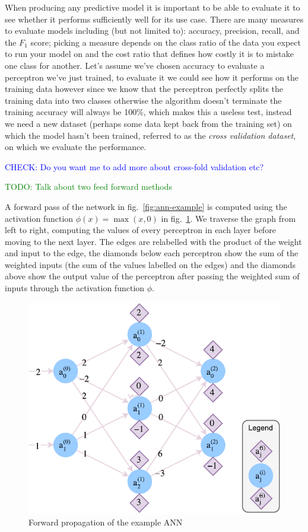 \documentclass[A4paper,draft]{scrreprt}
\begin{document}
When producing any predictive model it is important to be able to
evaluate it to see whether it performs sufficiently well for its use
case. There are many measures to evaluate models including (but not
limited to): accuracy, precision, recall, and the \(F_1\) score; picking
a measure depends on the class ratio of the data you expect to run your
model on and the cost ratio that defines how costly it is to mistake one
class for another. Let's assume we've chosen accuracy to evaluate a
perceptron we've just trained, to evaluate it we could see how it
performs on the training data however since we know that the perceptron
perfectly splits the training data into two classes otherwise the
algorithm doesn't terminate the training accuracy will always be 100\%,
which makes this a useless test, instead we need a new dataset (perhaps
some data kept back from the training set) on which the model hasn't
been trained, referred to as the \emph{cross validation dataset}, on
which we evaluate the performance.

\textcolor{blue}{CHECK: Do you want me to add more about cross-fold validation etc?}\newline

\textcolor{green}{TODO: Talk about two feed forward methods}\newline

A forward pass of the network in fig.~\ref{fig:ann-example} is computed
using the activation function \({\phi(x) = \max(x, 0)}\) in
fig.~\ref{fig:ann-forward}. We traverse the graph from left to right,
computing the values of every perceptron in each layer before moving to
the next layer. The edges are relabelled with the product of the weight
and input to the edge, the diamonds below each perceptron show the sum
of the weighted inputs (the sum of the values labelled on the edges) and
the diamonds above show the output value of the perceptron after passing
the weighted sum of inputs through the activation function \(\phi\).

\begin{figure}
\centering
\includegraphics{media/images/ann-forward.pdf}
\caption{Forward propagation of the example ANN}\label{fig:ann-forward}
\end{figure}
\end{document}
